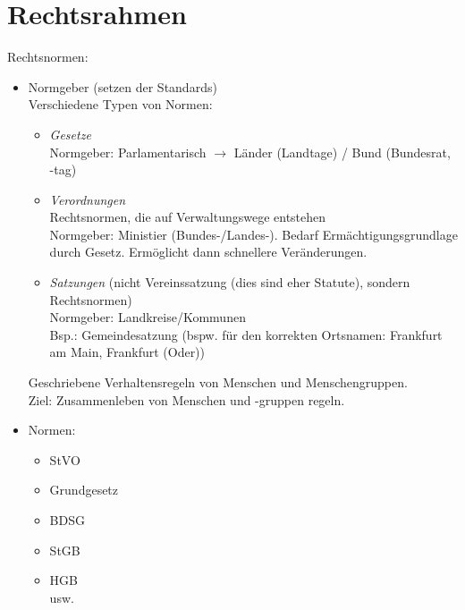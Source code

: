 \documentclass{scrreprt}
\begin{document}
\section{Rechtsrahmen}
Rechtsnormen:
\begin{itemize}
\item Normgeber (setzen der Standards)\\
Verschiedene Typen von Normen:
\begin{itemize}
\item \emph{Gesetze}\\
Normgeber: Parlamentarisch $\to$ Länder (Landtage) / Bund (Bundesrat, -tag)
\item \emph{Verordnungen}\\
Rechtsnormen, die auf Verwaltungswege entstehen\\
Normgeber: Ministier (Bundes-/Landes-). Bedarf Ermächtigungsgrundlage durch Gesetz. Ermöglicht dann schnellere Veränderungen.
\item \emph{Satzungen} (nicht Vereinssatzung (dies sind eher Statute), sondern Rechtsnormen)\\
Normgeber: Landkreise/Kommunen\\
Bsp.: Gemeindesatzung (bspw. für den korrekten Ortsnamen: Frankfurt am Main, Frankfurt (Oder))
\end{itemize}
Geschriebene Verhaltensregeln von Menschen und Menschengruppen.\\
Ziel: Zusammenleben von Menschen und -gruppen regeln.
\item Normen:
\begin{itemize}
\item StVO
\item Grundgesetz
\item BDSG
\item StGB
\item HGB\\
usw.
\end{itemize}
\end{itemize}
\end{document}
